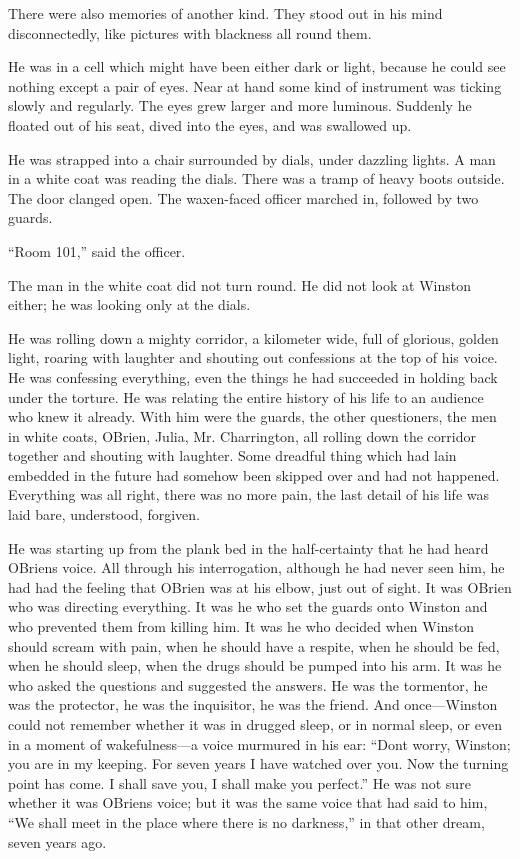 There were also memories of another kind. They stood out in his mind
disconnectedly, like pictures with blackness all round them.

He was in a cell which might have been either dark or light, because he
could see nothing except a pair of eyes. Near at hand some kind of
instrument was ticking slowly and regularly. The eyes grew larger and
more luminous. Suddenly he floated out of his seat, dived into the eyes,
and was swallowed up.

He was strapped into a chair surrounded by dials, under dazzling lights.
A man in a white coat was reading the dials. There was a tramp of heavy
boots outside. The door clanged open. The waxen-faced officer marched
in, followed by two guards.

``Room 101,'' said the officer.

The man in the white coat did not turn round. He did not look at Winston
either; he was looking only at the dials.

He was rolling down a mighty corridor, a kilometer wide, full of
glorious, golden light, roaring with laughter and shouting out
confessions at the top of his voice. He was confessing everything, even
the things he had succeeded in holding back under the torture. He was
relating the entire history of his life to an audience who knew it
already. With him were the guards, the other questioners, the men in
white coats, O\textquotesingle Brien, Julia, Mr. Charrington, all
rolling down the corridor together and shouting with laughter. Some
dreadful thing which had lain embedded in the future had somehow been
skipped over and had not happened. Everything was all right, there was
no more pain, the last detail of his life was laid bare, understood,
forgiven.

He was starting up from the plank bed in the half-certainty that he had
heard O\textquotesingle Brien\textquotesingle s voice. All through his
interrogation, although he had never seen him, he had had the feeling
that O\textquotesingle Brien was at his elbow, just out of sight. It was
O\textquotesingle Brien who was directing everything. It was he who set
the guards onto Winston and who prevented them from killing him. It was
he who decided when Winston should scream with pain, when he should have
a respite, when he should be fed, when he should sleep, when the drugs
should be pumped into his arm. It was he who asked the questions and
suggested the answers. He was the tormentor, he was the protector, he
was the inquisitor, he was the friend. And once---Winston could not
remember whether it was in drugged sleep, or in normal sleep, or even in
a moment of wakefulness---a voice murmured in his ear:
``Don\textquotesingle t worry, Winston; you are in my keeping. For seven
years I have watched over you. Now the turning point has come. I shall
save you, I shall make you perfect.'' He was not sure whether it was
O\textquotesingle Brien\textquotesingle s voice; but it was the same
voice that had said to him, ``We shall meet in the place where there is
no darkness,'' in that other dream, seven years ago.

